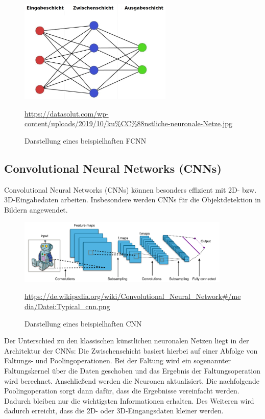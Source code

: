 	\begin{figure}[H]
		\centering
		\includegraphics[width=0.65\textwidth]{kapitel3/images/Simples_Neuronales_Netz.jpg}
		\caption{Darstellung eines beispielhaften FCNN}
		\vspace{0.2cm}
		\quelle\url{https://datasolut.com/wp-content/uploads/2019/10/ku%CC%88nstliche-neuronale-Netze.jpg}
	\end{figure}

\subsection{Convolutional Neural Networks (CNNs)}

	Convolutional Neural Networks (CNNs) können besonders effizient mit 2D- bzw. 3D-Eingabedaten arbeiten. Insbesondere werden CNNs für die Objektdetektion in Bildern angewendet. \cite{datasolut4} \\
	
	\begin{figure}[H]
		\centering
		\includegraphics[width=0.9\textwidth]{kapitel3/images/cnn.png}
		\caption{Darstellung eines beispielhaften CNN}
		\vspace{0.2cm}
		\quelle\url{https://de.wikipedia.org/wiki/Convolutional_Neural_Network#/media/Datei:Typical_cnn.png}
	\end{figure}

	Der Unterschied zu den klassischen künstlichen neuronalen Netzen liegt in der Architektur der CNNs: Die Zwischenschicht basiert hierbei auf einer Abfolge von Faltungs- und Poolingoperationen. Bei der Faltung wird ein sogenannter Faltungskernel über die Daten geschoben und das Ergebnis der Faltungsoperation wird berechnet. Anschließend werden die Neuronen aktualisiert. Die nachfolgende Poolingoperation sorgt dann dafür, dass die Ergebnisse vereinfacht werden. Dadurch bleiben nur die wichtigsten Informationen erhalten.	Des Weiteren wird dadurch erreicht, dass die 2D- oder 3D-Eingangsdaten kleiner werden. \cite{datasolut4}


